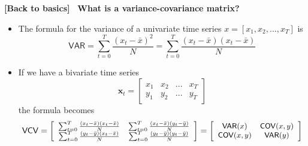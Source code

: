 \documentclass[10pt,handout]{beamer}
\begin{document}
\begin{frame}
{{\footnotesize \textbf{[Back to basics]}} \textbf{\ {What is a
variance-covariance matrix?} }}

\begin{itemize}
\item The formula for the variance of a univariate time series $%
x=[x_{1},x_{2},...,x_{T}]$ is%
\begin{equation*}
\mathsf{VAR}=\sum_{t=0}^{T}\frac{\left( x_{t}-\bar{x}\right) ^{2}}{N}%
=\sum_{t=0}^{T}\frac{\left( x_{t}-\bar{x}\right) \left( x_{t}-\bar{x}\right) 
}{N}
\end{equation*}%
\pause

\item If we have a bivariate time series 
\begin{equation*}
\mathbf{x}_{t}=\left[ 
\begin{array}{cccc}
x_{1} & x_{2} & ... & x_{T} \\ 
y_{1} & y_{2} & ... & y_{T}%
\end{array}%
\right] 
\end{equation*}%
\pause the formula becomes%
\begin{equation*}
\small\mathsf{VCV}=\left[ 
\begin{array}{cc}
\sum_{t=0}^{T}\frac{\left( x_{t}-\bar{x}\right) \left( x_{t}-\bar{x}\right) 
}{N} & \sum_{t=0}^{T}\frac{\left( x_{t}-\bar{x}\right) \left( y_{t}-\bar{y}%
\right) }{N} \\ 
\sum_{t=0}^{T}\frac{\left( y_{t}-\bar{y}\right) \left( x_{t}-\bar{x}\right) 
}{N} & \sum_{t=0}^{T}\frac{\left( y_{t}-\bar{y}\right) \left( y_{t}-\bar{y}%
\right) }{N}%
\end{array}%
\right] =\left[ 
\begin{array}{cc}
\mathsf{VAR}(x) & \mathsf{COV}(x,y) \\ 
\mathsf{COV}(x,y) & \mathsf{VAR}(y)%
\end{array}%
\right] 
\end{equation*}
\end{itemize}
\end{frame}

\everymath\expandafter{\the\everymath \color{title!80}}
\everydisplay\expandafter{\the\everydisplay \color{title!80}}%
\end{document}
